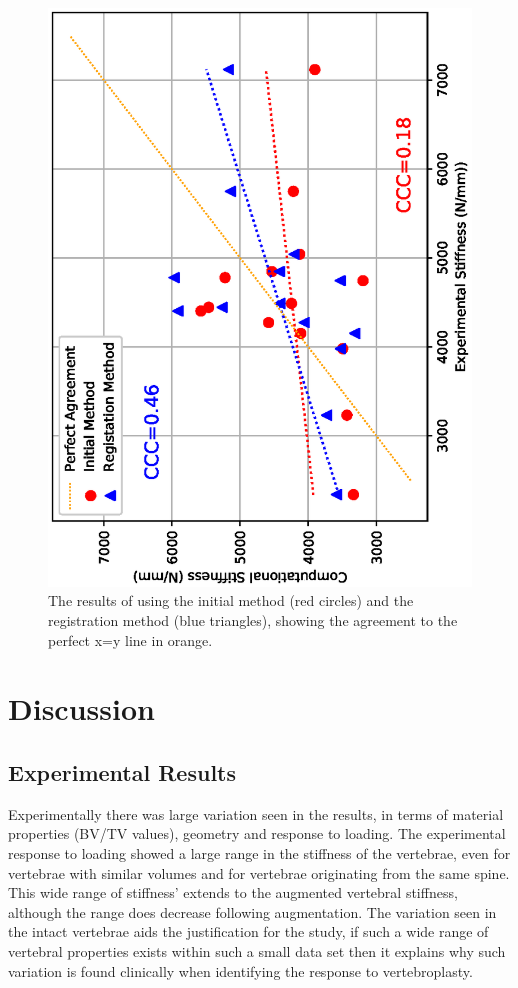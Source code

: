 \begin{figure}[h!]
  \centering
	\includegraphics[width=.65\textwidth, angle=270]{Chapters/Chapter_HT_images/aug_init_vs_best}
	\caption{The results of using the initial method (red circles) and the registration method (blue triangles), showing the agreement to the perfect x=y line in orange.}
	\label{fig:aug_init_vs_best}
\end{figure}
















\section{Discussion}





\subsection{Experimental Results}

Experimentally there was large variation seen in the results, in terms of material properties (BV/TV values), geometry and response to loading.
The experimental response to loading showed a large range in the stiffness of the vertebrae, even for vertebrae with similar volumes and for vertebrae originating from the same spine.
This wide range of stiffness' extends to the augmented vertebral stiffness, although the range does decrease following augmentation.
The variation seen in the intact vertebrae aids the justification for the study, if such a wide range of vertebral properties exists within such a small data set then it explains why such variation is found clinically when identifying the response to vertebroplasty.

